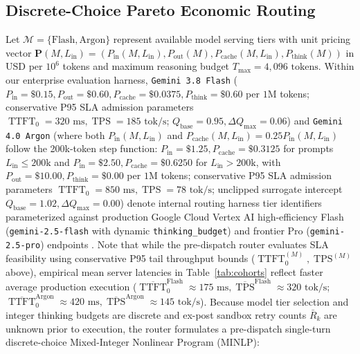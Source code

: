 \documentclass[conference,10pt]{IEEEtran}
\begin{document}
\subsection{Discrete-Choice Pareto Economic Routing}
Let $\mathcal{M} = \{\text{Flash}, \text{Argon}\}$ represent available model serving tiers with unit pricing vector $\mathbf{P}(M, L_{\text{in}}) = (P_{\text{in}}(M, L_{\text{in}}), P_{\text{out}}(M), P_{\text{cache}}(M, L_{\text{in}}), P_{\text{think}}(M))$ in USD per $10^6$ tokens and maximum reasoning budget $T_{\max} = 4{,}096\text{ tokens}$. Within our enterprise evaluation harness, \texttt{Gemini 3.8 Flash} ($P_{\text{in}}=\$0.15, P_{\text{out}}=\$0.60, P_{\text{cache}}=\$0.0375, P_{\text{think}}=\$0.60$ per $1\text{M}$ tokens; conservative P95 SLA admission parameters $\operatorname{TTFT}_0=320\text{ ms}, \operatorname{TPS}=185\text{ tok/s}$; $Q_{\text{base}}=0.95, \Delta Q_{\max}=0.06$) and \texttt{Gemini 4.0 Argon} (where both $P_{\text{in}}(M, L_{\text{in}})$ and $P_{\text{cache}}(M, L_{\text{in}}) = 0.25 P_{\text{in}}(M, L_{\text{in}})$ follow the 200k-token step function: $P_{\text{in}}=\$1.25, P_{\text{cache}}=\$0.3125$ for prompts $L_{\text{in}} \le 200\text{k}$ and $P_{\text{in}}=\$2.50, P_{\text{cache}}=\$0.6250$ for $L_{\text{in}} > 200\text{k}$, with $P_{\text{out}}=\$10.00, P_{\text{think}}=\$0.00$ per $1\text{M}$ tokens; conservative P95 SLA admission parameters $\operatorname{TTFT}_0=850\text{ ms}, \operatorname{TPS}=78\text{ tok/s}$; unclipped surrogate intercept $Q_{\text{base}}=1.02, \Delta Q_{\max}=0.00$) denote internal routing harness tier identifiers parameterized against production Google Cloud Vertex AI high-efficiency Flash (\texttt{gemini-2.5-flash} with dynamic \texttt{thinking\_\allowbreak budget}) and frontier Pro (\texttt{gemini-2.5-pro}) endpoints \cite{gemini2024, gemini2025}. Note that while the pre-dispatch router evaluates SLA feasibility using conservative P95 tail throughput bounds ($\operatorname{TTFT}_0^{(M)}, \operatorname{TPS}^{(M)}$ above), empirical mean server latencies in Table~\ref{tab:cohorts} reflect faster average production execution ($\overline{\operatorname{TTFT}}_0^{\text{Flash}} \approx 175\text{ ms}, \overline{\operatorname{TPS}}^{\text{Flash}} \approx 320\text{ tok/s}$; $\overline{\operatorname{TTFT}}_0^{\text{Argon}} \approx 420\text{ ms}, \overline{\operatorname{TPS}}^{\text{Argon}} \approx 145\text{ tok/s}$). Because model tier selection and integer thinking budgets are discrete and ex-post sandbox retry counts $\bar{R}_k$ are unknown prior to execution, the router formulates a pre-dispatch single-turn discrete-choice Mixed-Integer Nonlinear Program (MINLP):
\end{document}
